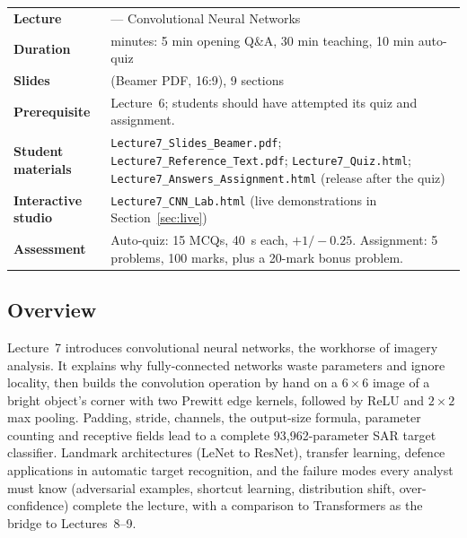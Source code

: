 \documentclass[11pt]{article}
\begin{document}
\begin{center}\small\renewcommand{\arraystretch}{1.25}\begin{tabularx}{\textwidth}{@{}>{\bfseries}p{3.3cm}>{\raggedright\arraybackslash}X@{}}\toprule

\textcolor{NavyN}{Lecture}&7 --- Convolutional Neural Networks\\
\textcolor{NavyN}{Duration}&45 minutes: 5 min opening Q\&A, 30 min teaching, 10 min auto-quiz\\
\textcolor{NavyN}{Slides}&24 (Beamer PDF, 16:9), 9 sections\\
\textcolor{NavyN}{Prerequisite}&Lecture~6; students should have attempted its quiz and assignment.\\
\textcolor{NavyN}{Student materials}&\texttt{Lecture7\_Slides\_Beamer.pdf}; \texttt{Lecture7\_Reference\_Text.pdf}; \texttt{Lecture7\_Quiz.html}; \texttt{Lecture7\_Answers\_Assignment.html} (release after the quiz)\\
\textcolor{NavyN}{Interactive studio}&\texttt{Lecture7\_CNN\_Lab.html} (live demonstrations in Section~\ref{sec:live})\\
\textcolor{NavyN}{Assessment}&Auto-quiz: 15 MCQs, 40~s each, $+1/-0.25$. Assignment: 5 problems, 100 marks, plus a 20-mark bonus problem.\\\bottomrule\end{tabularx}\end{center}

\subsection*{Overview}Lecture~7 introduces convolutional neural networks, the workhorse of imagery analysis. It explains why fully-connected networks waste parameters and ignore locality, then builds the convolution operation by hand on a $6\times6$ image of a bright object's corner with two Prewitt edge kernels, followed by ReLU and $2\times2$ max pooling. Padding, stride, channels, the output-size formula, parameter counting and receptive fields lead to a complete 93,962-parameter SAR target classifier. Landmark architectures (LeNet to ResNet), transfer learning, defence applications in automatic target recognition, and the failure modes every analyst must know (adversarial examples, shortcut learning, distribution shift, over-confidence) complete the lecture, with a comparison to Transformers as the bridge to Lectures~8--9.
\end{document}
